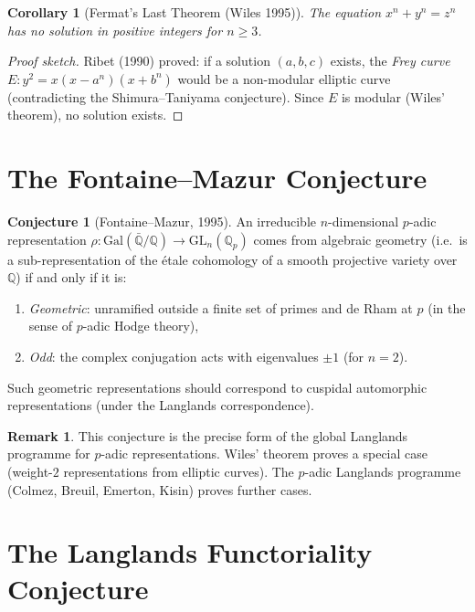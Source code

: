 \documentclass[12pt,a4paper]{amsart}
\newtheorem{corollary}[theorem]{Corollary}
\theoremstyle{definition}
\newtheorem{remark}[theorem]{Remark}
\newtheorem{conjecture}[theorem]{Conjecture}
\newcommand{\Q}{\mathbb{Q}}
\newcommand{\GL}{\mathrm{GL}}
\newcommand{\GQ}{\mathrm{Gal}(\bar{\Q}/\Q)}
\begin{document}
\begin{corollary}[Fermat's Last Theorem (Wiles 1995)]
The equation $x^n + y^n = z^n$ has no solution in positive integers for $n \ge 3$.
\end{corollary}

\begin{proof}[Proof sketch]
Ribet (1990) proved: if a solution $(a, b, c)$ exists, the \emph{Frey curve}
$E: y^2 = x(x - a^n)(x + b^n)$ would be a non-modular elliptic curve
(contradicting the Shimura--Taniyama conjecture).  Since $E$ is modular
(Wiles' theorem), no solution exists.
\end{proof}

\section{The Fontaine--Mazur Conjecture}

\begin{conjecture}[Fontaine--Mazur, 1995]
\label{conj:fontaine_mazur}
An irreducible $n$-dimensional $p$-adic representation $\rho : \GQ \to \GL_n(\Q_p)$
comes from algebraic geometry (i.e.\ is a sub-representation of the étale
cohomology of a smooth projective variety over $\Q$) if and only if it is:
\begin{enumerate}[label=(\roman*)]
  \item \emph{Geometric}: unramified outside a finite set of primes and de Rham
    at $p$ (in the sense of $p$-adic Hodge theory),
  \item \emph{Odd}: the complex conjugation acts with eigenvalues $\pm 1$ (for $n=2$).
\end{enumerate}
Such geometric representations should correspond to cuspidal automorphic representations
(under the Langlands correspondence).
\end{conjecture}

\begin{remark}
This conjecture is the precise form of the global Langlands programme for
$p$-adic representations.  Wiles' theorem proves a special case
(weight-$2$ representations from elliptic curves).  The $p$-adic Langlands
programme (Colmez, Breuil, Emerton, Kisin) proves further cases.
\end{remark}

\section{The Langlands Functoriality Conjecture}
\end{document}
